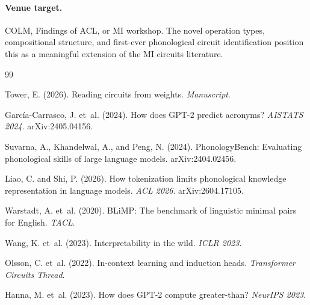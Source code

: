 \documentclass{article}
\begin{document}
\paragraph{Venue target.}
COLM, Findings of ACL, or MI workshop. The novel operation types,
compositional structure, and first-ever phonological circuit identification
position this as a meaningful extension of the MI circuits literature.


\begin{thebibliography}{99}

Tower, E. (2026). Reading circuits from weights. \textit{Manuscript}.

Garc\'ia-Carrasco, J. et~al. (2024). How does GPT-2 predict acronyms?
  \textit{AISTATS 2024}. arXiv:2405.04156.

Suvarna, A., Khandelwal, A., and Peng, N. (2024). PhonologyBench: Evaluating
  phonological skills of large language models. arXiv:2404.02456.

Liao, C. and Shi, P. (2026). How tokenization limits phonological knowledge
  representation in language models. \textit{ACL 2026}. arXiv:2604.17105.

Warstadt, A. et~al. (2020). BLiMP: The benchmark of linguistic minimal pairs
  for English. \textit{TACL}.

Wang, K. et~al. (2023). Interpretability in the wild. \textit{ICLR 2023}.

Olsson, C. et~al. (2022). In-context learning and induction heads.
  \textit{Transformer Circuits Thread}.

Hanna, M. et~al. (2023). How does GPT-2 compute greater-than?
  \textit{NeurIPS 2023}.

\end{thebibliography}
\end{document}
